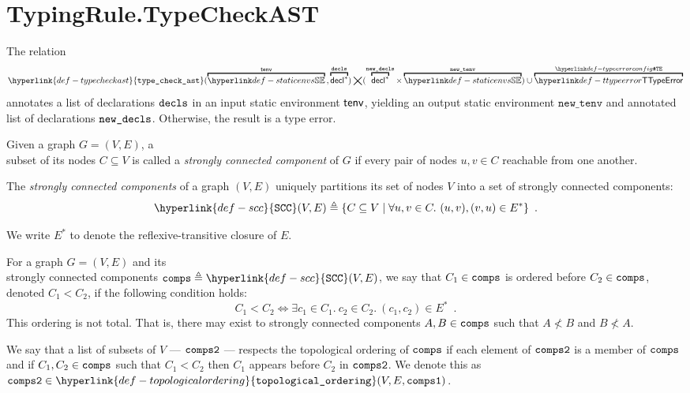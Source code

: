 \documentclass{book}
\newcommand\typecheckast[0]{\hyperlink{def-typecheckast}{\texttt{type\_check\_ast}}}
\newcommand\SCC[0]{\hyperlink{def-scc}{\texttt{SCC}}}
\newcommand\topologicalordering[0]{\hyperlink{def-topologicalordering}{\texttt{topological\_ordering}}}
\newcommand\newtenv[0]{\texttt{new\_tenv}}
\begin{document}
\section{TypingRule.TypeCheckAST \label{sec:TypingRule.TypeCheckAST}}
\hypertarget{def-typecheckast}{}
The relation
\[
\typecheckast(
  \overname{\staticenvs}{\tenv} \aslsep
  \overname{\decl^*}{\decls}
) \aslrel
(\overname{\decl^*}{\newdecls} \times \overname{\staticenvs}{\newtenv})
\cup \overname{\TTypeError}{\TypeErrorConfig}
\]
annotates a list of declarations $\texttt{decls}$ in an input static environment $\textsf{tenv}$,
yielding an output static environment $\newtenv$ and annotated list of declarations $\texttt{new\_decls}$.
Otherwise, the result is a type error.

\begin{definition}
\hypertarget{def-scc}{}
Given a graph $G=(V, E)$, a \\ subset of its nodes $C \subseteq V$ is called
a \emph{strongly connected component} of $G$ if
every pair of nodes $u,v \in C$ reachable from one another.

The \emph{strongly connected components} of a graph $(V, E)$ uniquely partitions its set of
nodes $V$ into a set of strongly connected components:
\[
\SCC(V, E) \triangleq \{ C \subseteq V \;|\; \forall u,v\in C.\ (u,v), (v,u) \in E^* \} \enspace.
\]

We write $E^*$ to denote the reflexive-transitive closure of $E$.
\end{definition}

\begin{definition}
For a graph $G=(V, E)$ and its \\
strongly connected components $\comps \triangleq \SCC(V, E)$,
we say that $C_1\in\texttt{comps}$ is ordered before $C_2\in\texttt{comps}$, denoted $C_1 < C_2$,
if the following condition holds:
\[
C_1 < C_2 \Leftrightarrow \exists c_1\in C_1.\ c_2\in C_2.\ (c_1,c_2) \in E^* \enspace.
\]
This ordering is not total. That is, there may exist to strongly connected components
$A,B\in\texttt{comps}$ such that $A \not< B$ and $B \not< A$.

\hypertarget{def-topologicalordering}{}
We say that a list of subsets of $V$ --- $\texttt{comps2}$ --- respects the topological ordering of $\texttt{comps}$
if each element of $\texttt{comps2}$ is a member of $\texttt{comps}$ and if $C_1,C_2\in\texttt{comps}$ such that
$C_1 < C_2$ then $C_1$ appears before $C_2$ in $\texttt{comps2}$.
We denote this as $\compstwo \in \topologicalordering(V, E, \compsone)$.
\end{definition}
\end{document}
